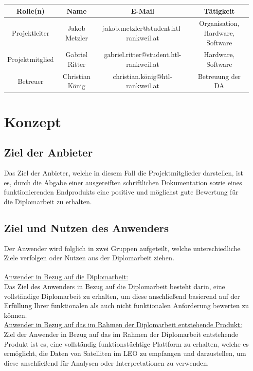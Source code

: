 \begin{tabular}{|c|c|c|c|}
	\hline
	Rolle(n) & Name & E-Mail & Tätigkeit \\
	\hline
	Projektleiter & Jakob Metzler & jakob.metzler@student.htl-rankweil.at & Organisation, Hardware, Software \\
	\hline
	Projektmitglied & Gabriel Ritter & gabriel.ritter@student.htl-rankweil.at & Hardware, Software \\
	\hline
	Betreuer & Christian König & christian.könig@htl-rankweil.at & Betreuung der DA \\
	\hline
\end{tabular}

\section{Konzept}
\subsection{Ziel der Anbieter}
Das Ziel der Anbieter, welche in diesem Fall die Projektmitglieder darstellen, ist es, durch die Abgabe 
einer ausgereiften schriftlichen Dokumentation sowie eines funktionierenden Endprodukts eine 
positive und möglichst gute Bewertung für die Diplomarbeit zu erhalten.

\subsection{Ziel und Nutzen des Anwenders}
Der Anwender wird folglich in zwei Gruppen aufgeteilt, welche unterschiedliche Ziele verfolgen oder 
Nutzen aus der Diplomarbeit ziehen.\\
\\
\underline{Anwender in Bezug auf die Diplomarbeit:}\\ 
Das Ziel des Anwenders in Bezug auf die Diplomarbeit besteht darin, eine vollständige Diplomarbeit zu 
erhalten, um diese anschließend basierend auf der Erfüllung Ihrer funktionalen als auch nicht
funktionalen Anforderung bewerten zu können. \\
\underline{Anwender in Bezug auf das im Rahmen der Diplomarbeit entstehende Produkt:}\\ 
Ziel der Anwender in Bezug auf das im Rahmen der Diplomarbeit entstehende Produkt ist es, eine 
vollständig funktionstüchtige Plattform zu erhalten, welche es ermöglicht, die Daten von Satelliten im 
LEO zu empfangen und darzustellen, um diese anschließend für Analysen oder Interpretationen zu 
verwenden.

